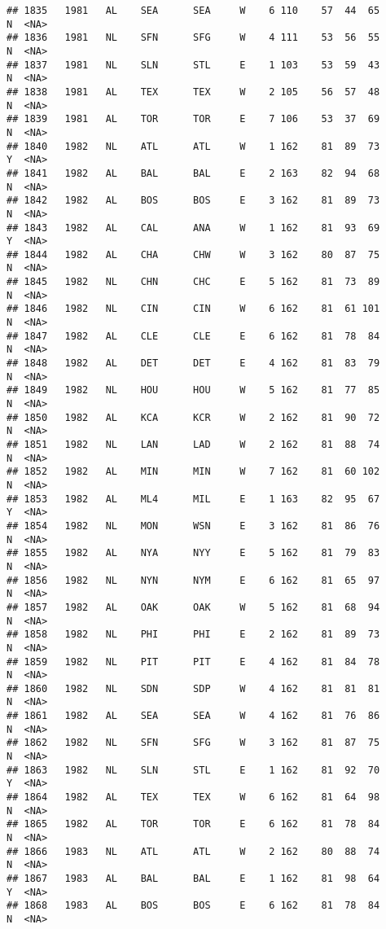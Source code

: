 \documentclass[]{article}
\begin{document}
\begin{verbatim}
## 1835   1981   AL    SEA      SEA     W    6 110    57  44  65      N  <NA>
## 1836   1981   NL    SFN      SFG     W    4 111    53  56  55      N  <NA>
## 1837   1981   NL    SLN      STL     E    1 103    53  59  43      N  <NA>
## 1838   1981   AL    TEX      TEX     W    2 105    56  57  48      N  <NA>
## 1839   1981   AL    TOR      TOR     E    7 106    53  37  69      N  <NA>
## 1840   1982   NL    ATL      ATL     W    1 162    81  89  73      Y  <NA>
## 1841   1982   AL    BAL      BAL     E    2 163    82  94  68      N  <NA>
## 1842   1982   AL    BOS      BOS     E    3 162    81  89  73      N  <NA>
## 1843   1982   AL    CAL      ANA     W    1 162    81  93  69      Y  <NA>
## 1844   1982   AL    CHA      CHW     W    3 162    80  87  75      N  <NA>
## 1845   1982   NL    CHN      CHC     E    5 162    81  73  89      N  <NA>
## 1846   1982   NL    CIN      CIN     W    6 162    81  61 101      N  <NA>
## 1847   1982   AL    CLE      CLE     E    6 162    81  78  84      N  <NA>
## 1848   1982   AL    DET      DET     E    4 162    81  83  79      N  <NA>
## 1849   1982   NL    HOU      HOU     W    5 162    81  77  85      N  <NA>
## 1850   1982   AL    KCA      KCR     W    2 162    81  90  72      N  <NA>
## 1851   1982   NL    LAN      LAD     W    2 162    81  88  74      N  <NA>
## 1852   1982   AL    MIN      MIN     W    7 162    81  60 102      N  <NA>
## 1853   1982   AL    ML4      MIL     E    1 163    82  95  67      Y  <NA>
## 1854   1982   NL    MON      WSN     E    3 162    81  86  76      N  <NA>
## 1855   1982   AL    NYA      NYY     E    5 162    81  79  83      N  <NA>
## 1856   1982   NL    NYN      NYM     E    6 162    81  65  97      N  <NA>
## 1857   1982   AL    OAK      OAK     W    5 162    81  68  94      N  <NA>
## 1858   1982   NL    PHI      PHI     E    2 162    81  89  73      N  <NA>
## 1859   1982   NL    PIT      PIT     E    4 162    81  84  78      N  <NA>
## 1860   1982   NL    SDN      SDP     W    4 162    81  81  81      N  <NA>
## 1861   1982   AL    SEA      SEA     W    4 162    81  76  86      N  <NA>
## 1862   1982   NL    SFN      SFG     W    3 162    81  87  75      N  <NA>
## 1863   1982   NL    SLN      STL     E    1 162    81  92  70      Y  <NA>
## 1864   1982   AL    TEX      TEX     W    6 162    81  64  98      N  <NA>
## 1865   1982   AL    TOR      TOR     E    6 162    81  78  84      N  <NA>
## 1866   1983   NL    ATL      ATL     W    2 162    80  88  74      N  <NA>
## 1867   1983   AL    BAL      BAL     E    1 162    81  98  64      Y  <NA>
## 1868   1983   AL    BOS      BOS     E    6 162    81  78  84      N  <NA>

\end{verbatim}
\end{document}
